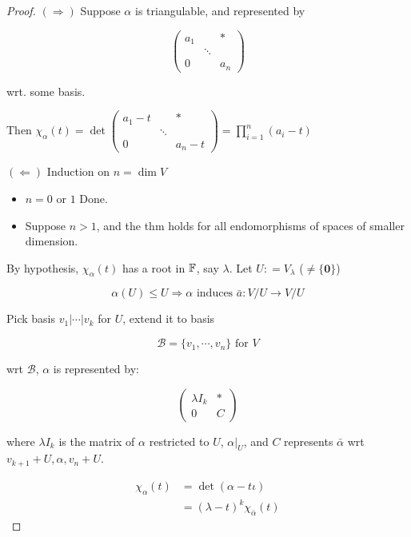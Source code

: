 \documentclass[a4paper]{article}
\begin{document}
\begin{proof}
	$ (\Rightarrow) $ Suppose $ \alpha $ is triangulable, and represented by 
	
	\[ \begin{pmatrix}
	a_{1} &  & * \\
	 & \ddots &  \\
	0 &  & a_{n}
	\end{pmatrix} \]
	
	
	wrt. some basis.
	
	Then $ \chi_{\alpha}(t) = \det \begin{pmatrix}
	a_{1}  - t&  & * \\
	 & \ddots &  \\
	0 &  & a_{n} - t
	\end{pmatrix} = \prod_{i=1}^{n}(a_{i} - t) $
	
	
	$ (\Leftarrow) $ Induction on $ n = \dim V $
	
	\begin{itemize}
		\item $ n = 0 $ or $ 1 $ Done.
		\item Suppose $ n > 1 $, and the thm holds for all endomorphisms of spaces of smaller dimension.
	\end{itemize}

	By hypothesis, $ \chi_{\alpha}(t) $ has a root in $ \mathbb{F} $, say $ \lambda $. Let $ U : = V_{\lambda} $ ($ \neq \{ \mathbf{0} \} $) 
	
	\[ \alpha(U) \leq U \Rightarrow \alpha \text{ induces  } \bar{a} : V / U \to V / U  \]
	
	Pick basis $ v_{1} | \cdots | v_{k} $ for $ U $, extend it to basis 
	
	\[ \mathcal{B} = \{  v_{1}, \cdots, v_{n} \} \text{ for } V \]
	
	wrt $ \mathcal{B} $, $ \alpha $ is represented by:
	
	\[ \begin{pmatrix}
	\lambda I_{k} & * \\
	0 & C
	\end{pmatrix} \]
	
	
	where $ \lambda I_{k} $ is the matrix of $ \alpha $ restricted to $ U $, $ \alpha |_{U} $, and $ C $ represents $ \bar{\alpha} $ wrt $ v_{k+1} + U, \alpha, v_{n} + U $.
	
	\begin{align*}
	\chi_{\alpha}(t) & = \det(\alpha - t \iota) \\
	& = (\lambda - t)^{k} \chi_{\bar{\alpha}}(t)
	\end{align*}
	

\end{proof}
\end{document}

